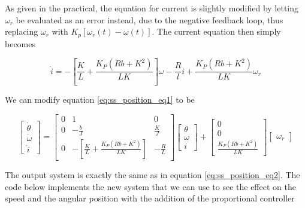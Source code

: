 \documentclass[a4paper, 12pt]{article}
\begin{document}
As given in the practical, the equation for current is slightly modified by
letting $\omega_r$ be evaluated as an error instead, due to the negative
feedback loop, thus replacing $\omega_r$ with $K_p[\omega_r(t) - \omega(t)]$.
The current equation then simply becomes

\begin{equation}
	\dot i = -\left[ \frac{K}{L} + \frac{K_P(Rb + K^2)}{LK} \right]\omega - \frac{R}{l}i + \frac{K_P(Rb + K^2)}{LK}\omega_r
	\label{eq:3_current}
\end{equation}

We can modify equation \eqref{eq:ss_position_eq1} to be

\begin{equation}
  \left[
  \begin{array}{c}
    \dot \theta \\
    \dot \omega \\
    \dot i
  \end{array}
  \right]
  =
  \left[
  \begin{array}{ccc}
    0 & 1 & 0 \\
    0 & -\frac{b}{J} & \frac{K}{J} \\
    0 & -\left[ \frac{K}{L} + \frac{K_P(Rb + K^2)}{LK} \right] & -\frac{R}{L}
  \end{array}
  \right]
  \left[
  \begin{array}{c}
    \theta \\
    \omega \\
    i
  \end{array}
  \right]
  +
  \left[
  \begin{array}{c}
    0 \\
    0 \\
    \frac{K_P(Rb + K^2)}{LK}
  \end{array}
  \right]
  \left[
  \begin{array}{c}
    \omega_r
  \end{array}
  \right]
  \label{eq:3_ss_position}
\end{equation}

The output system is exactly the same as in equation \eqref{eq:ss_position_eq2}. The code below implements the new system that we can use to see the effect on the speed and the angular position with the addition of the proportional controller 
\end{document}
